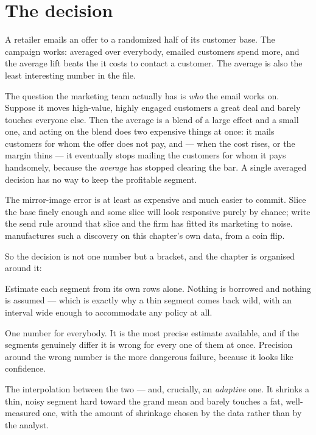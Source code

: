 \section{The decision}
\label{sec:seg:decision}

A retailer emails an offer to a randomized half of its customer base. The campaign works: averaged
over everybody, emailed customers spend more, and the average lift beats the \eur{\nbTwoCost} it
costs to contact a customer. The average is also the least interesting number in the file.

The question the marketing team actually has is \emph{who} the email works on. Suppose it moves
high-value, highly engaged customers a great deal and barely touches everyone else. Then the
average is a blend of a large effect and a small one, and acting on the blend does two expensive
things at once: it mails customers for whom the offer does not pay, and --- when the cost rises, or
the margin thins --- it eventually stops mailing the customers for whom it pays handsomely, because
the \emph{average} has stopped clearing the bar. A single averaged decision has no way to keep the
profitable segment.

The mirror-image error is at least as expensive and much easier to commit. Slice the base finely
enough and some slice will look responsive purely by chance; write the send rule around that slice
and the firm has fitted its marketing to noise.  manufactures such a discovery
on this chapter's own data, from a coin flip.

So the decision is not one number but a bracket, and the chapter is organised around it:

\begin{description}[leftmargin=1.4em, style=nextline, itemsep=.3em]
  \item[No pooling.] Estimate each segment from its own rows alone. Nothing is borrowed and nothing
    is assumed --- which is exactly why a thin segment comes back wild, with an interval wide enough
    to accommodate any policy at all.
  \item[Complete pooling.] One number for everybody. It is the most precise estimate available, and
    if the segments genuinely differ it is wrong for every one of them at once. Precision around
    the wrong number is the more dangerous failure, because it looks like confidence.
  \item[Partial pooling.] The interpolation between the two --- and, crucially, an
    \emph{adaptive} one. It shrinks a thin, noisy segment hard toward the grand mean and barely
    touches a fat, well-measured one, with the amount of shrinkage chosen by the data rather than
    by the analyst.
\end{description}

